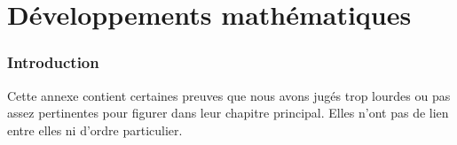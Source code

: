 \chapter{Développements mathématiques}

\subsection*{Introduction}
Cette annexe contient certaines preuves
que nous avons jugés trop lourdes ou pas assez pertinentes
pour figurer dans leur chapitre principal.
Elles n'ont pas de lien entre elles ni d'ordre particulier.



